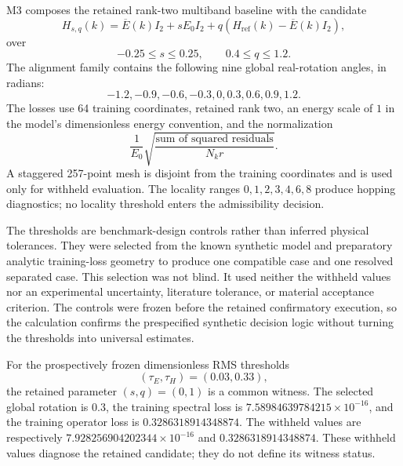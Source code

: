 M3 composes the retained rank-two multiband baseline with the candidate
\begin{equation}
  H_{s,q}(k)
  =
  \overline E(k)I_2+sE_0I_2
  +q\left(H_{\mathrm{ref}}(k)-\overline E(k)I_2\right),
\end{equation}
over
\begin{equation}
  -0.25\leq s\leq0.25,
  \qquad
  0.4\leq q\leq1.2.
\end{equation}
The alignment family contains the following nine global real-rotation angles,
in radians:
\begin{equation}
  -1.2,-0.9,-0.6,-0.3,0,0.3,0.6,0.9,1.2.
\end{equation}
The losses use 64 training coordinates, retained rank two, an energy scale of
$1$ in the model's dimensionless energy convention, and the normalization
\begin{equation}
  \frac{1}{E_0}
  \sqrt{\frac{\text{sum of squared residuals}}{N_k r}}.
\end{equation}
A staggered 257-point mesh is disjoint from the training coordinates and is
used only for withheld evaluation. The locality ranges
$0,1,2,3,4,6,8$ produce hopping diagnostics; no locality threshold enters the
admissibility decision.

The thresholds are benchmark-design controls rather than inferred physical
tolerances. They were selected from the known synthetic model and preparatory
analytic training-loss geometry to produce one compatible case and one resolved
separated case. This selection was not blind. It used neither the withheld
values nor an experimental uncertainty, literature tolerance, or material
acceptance criterion. The controls were frozen before the retained confirmatory
execution, so the calculation confirms the prespecified synthetic decision
logic without turning the thresholds into universal estimates.

For the prospectively frozen dimensionless RMS thresholds
\begin{equation}
  (\tau_E,\tau_H)=(0.03,0.33),
\end{equation}
the retained parameter $(s,q)=(0,1)$ is a common witness. The selected global
rotation is $0.3$, the training spectral loss is
$7.58984639784215\times10^{-16}$, and the training operator loss is
$0.3286318914348874$. The withheld values are respectively
$7.928256904202344\times10^{-16}$ and $0.3286318914348874$. These withheld
values diagnose the retained candidate; they do not define its witness status.

